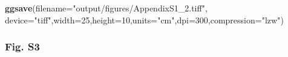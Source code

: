 \documentclass[
]{article}
\newenvironment{Shaded}{\begin{snugshade}}{\end{snugshade}}
\newcommand{\DataTypeTok}[1]{\textcolor[rgb]{0.13,0.29,0.53}{#1}}
\newcommand{\DecValTok}[1]{\textcolor[rgb]{0.00,0.00,0.81}{#1}}
\newcommand{\KeywordTok}[1]{\textcolor[rgb]{0.13,0.29,0.53}{\textbf{#1}}}
\newcommand{\NormalTok}[1]{#1}
\newcommand{\StringTok}[1]{\textcolor[rgb]{0.31,0.60,0.02}{#1}}
\begin{document}
\begin{Shaded}
\begin{Highlighting}[]
\KeywordTok{ggsave}\NormalTok{(}\DataTypeTok{filename=}\StringTok{"output/figures/AppendixS1\_2.tiff"}\NormalTok{,}
       \DataTypeTok{device=}\StringTok{"tiff"}\NormalTok{,}\DataTypeTok{width=}\DecValTok{25}\NormalTok{,}\DataTypeTok{height=}\DecValTok{10}\NormalTok{,}\DataTypeTok{units=}\StringTok{"cm"}\NormalTok{,}\DataTypeTok{dpi=}\DecValTok{300}\NormalTok{,}\DataTypeTok{compression=}\StringTok{"lzw"}\NormalTok{)}
\end{Highlighting}
\end{Shaded}

\hypertarget{fig.-s3}{%
\subsubsection{Fig. S3}\label{fig.-s3}}
\end{document}
